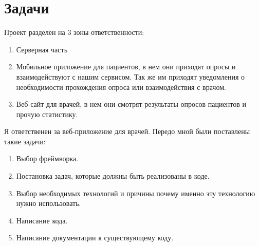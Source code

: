 \documentclass[a4paper,12pt]{article}
\begin{document}
    \section{Задачи}\label{sec:2}
    Проект разделен на 3 зоны ответственности:
    \begin{enumerate}
        \item Серверная часть
        \item Мобильное приложение для пациентов, в нем они приходят опросы и взаимодействуют с нашим сервисом.
        Так же им приходят уведомления о необходимости прохождения опроса или взаимодействия с врачом.
        \item Веб-сайт для врачей, в нем они смотрят результаты опросов пациентов и прочую статистику.
    \end{enumerate}
    Я ответственен за веб-приложение для врачей.
    Передо мной были поставлены такие задачи:


    \begin{enumerate}
        \item Выбор фреймворка.
        \item Постановка задач, которые должны быть реализованы в коде.
        \item Выбор необходимых технологий и причины почему именно эту технологию нужно использовать.
        \item Написание кода.
        \item Написание документации к существующему коду.

    \end{enumerate}

    \newpage
\end{document}
